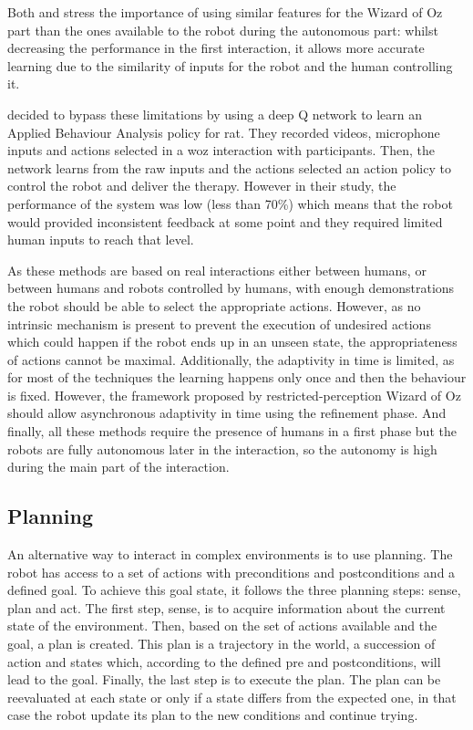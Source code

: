     Both \citet{knox2014learning} and \citet{sequeira2016discovering} stress the importance of using similar features for the Wizard of Oz part than the ones available to the robot during the autonomous part: whilst decreasing the performance in the first interaction, it allows more accurate learning due to the similarity of inputs for the robot and the human controlling it.
        
    \cite{clark2018deep} decided to bypass these limitations by using a deep Q network \citep{mnih2015human} to learn an Applied Behaviour Analysis policy for \gls{rat}. They recorded videos, microphone inputs and actions selected in a \gls{woz} interaction with participants. Then, the network learns from the raw inputs and the actions selected an action policy to control the robot and deliver the therapy. However in their study, the performance of the system was low (less than 70\%) which means that the robot would provided inconsistent feedback at some point and they required limited human inputs to reach that level. 
     
    As these methods are based on real interactions either between humans, or between humans and robots controlled by humans, with enough demonstrations the robot should be able to select the appropriate actions. However, as no intrinsic mechanism is present to prevent the execution of undesired actions which could happen if the robot ends up in an unseen state, the appropriateness of actions cannot be maximal. Additionally, the adaptivity in time is limited, as for most of the techniques the learning happens only once and then the behaviour is fixed. However, the framework proposed by restricted-perception Wizard of Oz should allow asynchronous adaptivity in time using the refinement phase. And finally, all these methods require the presence of humans in a first phase but the robots are fully autonomous later in the interaction, so the autonomy is high during the main part of the interaction.
    
\subsection{Planning} \label{ssec:planning}
    
    An alternative way to interact in complex environments is to use planning. The robot has access to a set of actions with preconditions and postconditions and a defined goal. To achieve this goal state, it follows the three planning steps: sense, plan and act. The first step, sense, is to acquire information about the current state of the environment. Then, based on the set of actions available and the goal, a plan is created. This plan is a trajectory in the world, a succession of action and states which, according to the defined pre and postconditions, will lead to the goal. Finally, the last step is to execute the plan. The plan can be reevaluated at each state or only if a state differs from the expected one, in that case the robot update its plan to the new conditions and continue trying.
    
